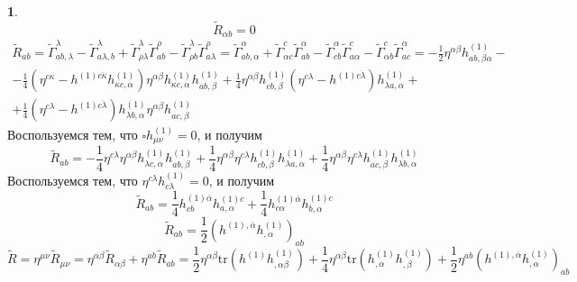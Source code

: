\documentclass[12pt]{article}
\theoremstyle{definition}
\newtheorem{zad}{}[section]
\begin{document}
\begin{zad}
\begin{equation}
\end{equation}
\begin{equation}
    \boxed{\tilde R_{\alpha b}=0}
\end{equation}
\begin{multline}
    \tilde R_{ab}=\tilde\Gamma^\lambda_{ab,\lambda}-\tilde\Gamma^\lambda_{a\lambda,b}+\tilde\Gamma^\lambda_{\rho\lambda}\tilde\Gamma^\rho_{ab}-\tilde\Gamma^\lambda_{\rho b}\tilde\Gamma^\rho_{a\lambda}=\tilde\Gamma^\alpha_{ab,\alpha}+\tilde\Gamma^c_{\alpha c}\tilde\Gamma^\alpha_{ab}-\tilde\Gamma^\alpha_{cb}\tilde\Gamma^c_{a\alpha}-\tilde\Gamma^c_{\alpha b}\tilde\Gamma^\alpha_{ac}=-\frac{1}{2}\eta^{\alpha\beta}h^{(1)}_{ab,\beta\alpha}-\\-\frac{1}{4}(\eta^{c\kappa}-h^{(1)\overline{c\kappa}}h^{(1)}_{\kappa c,\alpha})\eta^{\alpha\beta}h^{(1)}_{\kappa c,\alpha}h^{(1)}_{ab,\beta}+\frac{1}{4}\eta^{\alpha\beta}h^{(1)}_{cb,\beta}(\eta^{c\lambda}-h^{(1)\overline{c\lambda}})h^{(1)}_{\lambda a,\alpha}+\\+\frac{1}{4}(\eta^{c\lambda}-h^{(1)\overline{c\lambda}})h^{(1)}_{\lambda b,\alpha}\eta^{\alpha\beta}h^{(1)}_{ac,\beta}
\end{multline}
Воспользуемся тем, что $\square h^{(1)}_{\mu\nu}=0$, и получим
\begin{equation}
    \tilde R_{ab}=-\frac{1}{4}\eta^{c\lambda}\eta^{\alpha\beta}h^{(1)}_{\lambda c,\alpha}h^{(1)}_{ab,\beta}+\frac{1}{4}\eta^{\alpha\beta}\eta^{c\lambda}h^{(1)}_{cb,\beta}h^{(1)}_{\lambda a,\alpha}+\frac{1}{4}\eta^{\alpha\beta}\eta^{c\lambda}h^{(1)}_{ac,\beta}h^{(1)}_{\lambda b,\alpha}
\end{equation}
Воспользуемся тем, что $\eta^{c\lambda}h^{(1)}_{c\lambda}=0$, и получим
\begin{equation}
    \tilde R_{ab}=\frac{1}{4}h^{(1)\overline{\alpha}}_{cb}h^{(1)c}_{a,\alpha}+\frac{1}{4}h^{(1)\overline{\alpha}}_{c\alpha}h^{(1)c}_{b,\alpha}
\end{equation}
\begin{equation}
    \boxed{\tilde R_{ab}=\frac{1}{2}(h^{(1),\overline{\alpha}}h^{(1)}_{,\alpha})_{ab}}
\end{equation}
\begin{equation}
    \tilde R=\eta^{\mu\nu}\tilde R_{\mu\nu}=\eta^{\alpha\beta}\tilde R_{\alpha\beta}+\eta^{ab}\tilde R_{ab}=\frac{1}{2}\eta^{\alpha\beta}\text{tr}(h^{(1)}h^{(1)}_{,\alpha\beta})+\frac{1}{4}\eta^{\alpha\beta}\text{tr}(h^{(1)}_{,\alpha}h^{(1)}_{,\beta})+\frac{1}{2}\eta^{ab}(h^{(1),\overline{\alpha}}h^{(1)}_{,\alpha})_{ab}
\end{equation}

\end{zad}
\end{document}

